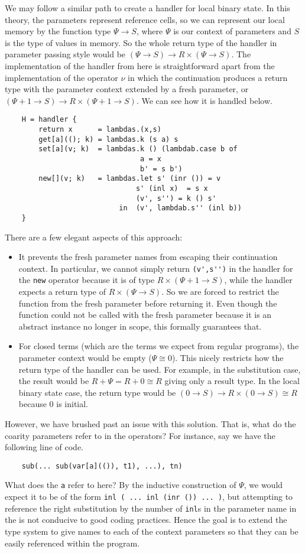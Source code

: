 \documentclass{scrartcl}
\theoremstyle{definition}
\newcommand{\PCtx}{\Psi}
\begin{document}
We may follow a similar path to create a handler for local binary state. In this theory, the parameters represent reference cells, so we can represent our local memory by the function type $\PCtx \to S$, where $\PCtx$ is our context of parameters and $S$ is the type of values in memory. So the whole return type of the handler in parameter passing style would be $(\PCtx \to S) \to R \times (\PCtx \to S)$. The implementation of the handler from here is straightforward apart from the implementation of the operator $\nu$ in which the continuation produces a return type with the parameter context extended by a fresh parameter, or $(\PCtx +1 \to S) \to R \times (\PCtx + 1 \to S)$. We can see how it is handled below.
\begin{lstlisting}
    H = handler {
        return x      = lambdas.(x,s)
        get[a]((); k) = lambdas.k (s a) s
        set[a](v; k)  = lambdas.k () (lambdab.case b of
                                a = x
                                b' = s b')
        new[](v; k)   = lambdas.let s' (inr ()) = v
                               s' (inl x)  = s x
                               (v', s'') = k () s'
                           in  (v', lambdab.s'' (inl b))
    }
\end{lstlisting}
There are a few elegant aspects of this approach:
\begin{itemize}
    \item It prevents the fresh parameter names from escaping their continuation context. In particular, we cannot simply return \lstinline{(v',s'')} in the handler for the \lstinline{new} operator because it is of type $R\times (\PCtx+1\to S)$, while the handler expects a return type of $R\times (\PCtx \to S)$. So we are forced to restrict the function from the fresh parameter before returning it. Even though the function could not be called with the fresh parameter because it is an abstract instance no longer in scope, this formally guarantees that.
    \item For closed terms (which are the terms we expect from regular programs), the parameter context would be empty ($\PCtx \cong 0$). This nicely restricts how the return type of the handler can be used. For example, in the substitution case, the result would be $R + \PCtx = R + 0 \cong R$ giving only a result type. In the local binary state case, the return type would be $(0 \to S) \to R \times (0 \to S) \cong R$ because $0$ is initial.
\end{itemize}
However, we have brushed past an issue with this solution. That is, what do the coarity parameters refer to in the operators? For instance, say we have the following line of code.
\begin{lstlisting}
    sub(... sub(var[a](()), t1), ...), tn)
\end{lstlisting}
What does the \lstinline{a} refer to here? By the inductive construction of $\PCtx$, we would expect it to be of the form \lstinline{inl ( ... inl (inr ()) ... )}, but attempting to reference the
right substitution by the number of \lstinline{inl}s in the parameter name in the is not conducive to good coding practices. Hence the goal is to extend the type system to give names to each of the context parameters so that they can be easily referenced within the program.
\end{document}
